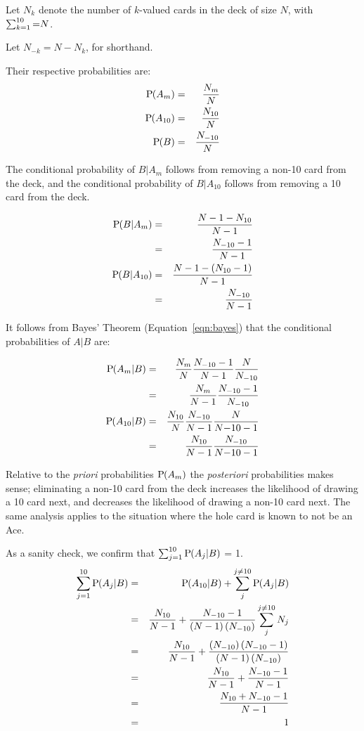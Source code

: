 \noindent
Let $N_k$ denote the number of $k$-valued cards in the deck of size $N$,
with $\sum_{k=1}^{10}{=}N$.

\noindent
Let $N_{-k}=N-N_k$, for shorthand.

\noindent
Their respective probabilities are:
\begin{eqnarray}
\textrm{P}\hspace{-.5ex}\left(A_m\right) &=& \frac{N_m}{N}\\
\textrm{P}\hspace{-.5ex}\left(A_{10}\right) &=& \frac{N_{10}}{N}\\
\textrm{P}\hspace{-.5ex}\left(B\right) &=& \frac{N_{-10}}{N}
\end{eqnarray}

\noindent
The conditional probability of $B|A_m$ follows from removing a non-10 card
from the deck, 
and the conditional probability of $B|A_{10}$ follows from removing a 10 card
from the deck.

\begin{eqnarray}
\textrm{P}\hspace{-.5ex}\left(B|A_m\right) &=& \frac{N-1-N_{10}}{N-1} \nonumber \\
&=& \frac{N_{-10}-1}{N-1}\\
\textrm{P}\hspace{-.5ex}\left(B|A_{10}\right) &=& \frac{N-1-\left(N_{10}-1\right)}{N-1} \nonumber \\
&=& \frac{N_{-10}}{N-1}
\end{eqnarray}

\noindent
It follows from Bayes' Theorem (Equation~\ref{eqn:bayes}) that
the conditional probabilities of $A|B$ are:

\begin{eqnarray}
\textrm{P}\hspace{-.5ex}\left(A_m|B\right) &=& \frac{N_m}{N}\frac{N_{-10}-1}{N-1}\frac{N}{N_{-10}} \nonumber \\
&=& \frac{N_m}{N-1}\frac{N_{-10}-1}{N_{-10}} \label{eqn:Am_B} \\
\textrm{P}\hspace{-.5ex}\left(A_{10}|B\right) &=& \frac{N_{10}}{N}\frac{N_{-10}}{N-1}\frac{N}{N{-10}-1} \nonumber \\
&=& \frac{N_{10}}{N-1}\frac{N_{-10}}{N{-10}-1} \label{eqn:A10_B}
\end{eqnarray}

Relative to the \emph{priori} probabilities $\textrm{P}\hspace{-.5ex}\left(A_m\right)$ the
\emph{posteriori} probabilities makes sense;
eliminating a non-10 card from the deck increases the likelihood
of drawing a 10 card next, and decreases the likelihood of drawing
a non-10 card next.
The same analysis applies to the situation where the hole card
is known to not be an Ace.

As a sanity check, we confirm that $\sum_{j=1}^{10}{\textrm{P}\hspace{-.5ex}\left(A_j|B\right)}$ = 1.
\begin{eqnarray}
\sum_{j=1}^{10}{\textrm{P}\hspace{-.5ex}\left(A_j|B\right)} &=&
\textrm{P}\hspace{-.5ex}\left(A_{10}|B\right) +\sum_{j}^{j\neq{}10}{\textrm{P}\hspace{-.5ex}\left(A_j|B\right)}\\
&=& \frac{N_{10}}{N-1}
  +\frac{N_{-10}-1}{\left(N-1\right)\left(N_{-10}\right)} \sum_{j}^{j\neq{}10}{N_j} \label{eqn:post_peek} \\
&=& \frac{N_{10}}{N-1} +\frac{\left(N_{-10}\right)\left(N_{-10}-1\right)}{\left(N-1\right)\left(N_{-10}\right)}\\
&=& \frac{N_{10}}{N-1} +\frac{N_{-10}-1}{N-1}\\
&=& \frac{N_{10}+N_{-10}-1}{N-1}\\
&=& 1
\end{eqnarray}

